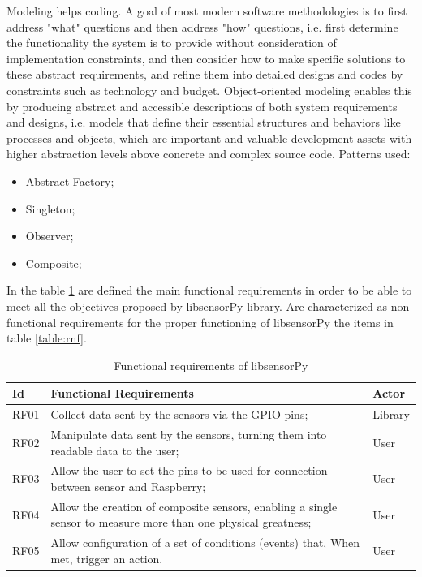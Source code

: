 \documentclass{acm_proc_article-sp}
\begin{document}
Modeling helps coding. A goal of most modern software methodologies is to first address "what" questions and then address "how" questions, i.e. first determine the functionality the system is to provide without consideration of implementation constraints, and then consider how to make specific solutions to these abstract requirements, and refine them into detailed designs and codes by constraints such as technology and budget. Object-oriented modeling enables this by producing abstract and accessible descriptions of both system requirements and designs, i.e. models that define their essential structures and behaviors like processes and objects, which are important and valuable development assets with higher abstraction levels above concrete and complex source code.
\newline
\newline
Patterns used:
\begin{itemize}
\item Abstract Factory;
\item Singleton;
\item Observer;
\item Composite;
\end{itemize}

In the table \ref{table:rf} are defined the main functional requirements in order to be able to meet all the objectives proposed by libsensorPy library. Are characterized as non-functional requirements for the proper functioning of libsensorPy the items in table \ref{table:rnf}.
 
\begin{table}[h]
 \caption{Functional requirements of libsensorPy}
 \label{table:rf}
 \begin{tabular}{|l|p{5.5cm}|l|}
 \hline  
 Id & Functional Requirements & Actor \\
 \hline  
 RF01 & Collect data sent by the sensors via the GPIO pins; & Library \\
 \hline 
 RF02 & Manipulate data sent by the sensors, turning them into readable data to the user; & User \\
 \hline 
 RF03 & Allow the user to set the pins to be used for connection between sensor and Raspberry; & User \\
 \hline 
 RF04 & Allow the creation of composite sensors, enabling a single sensor to measure more than one physical greatness; & User \\
 \hline 
 RF05 & Allow configuration of a set of conditions (events) that, When met, trigger an action. & User \\
\hline  
\end{tabular}
\end{table}
\end{document}
